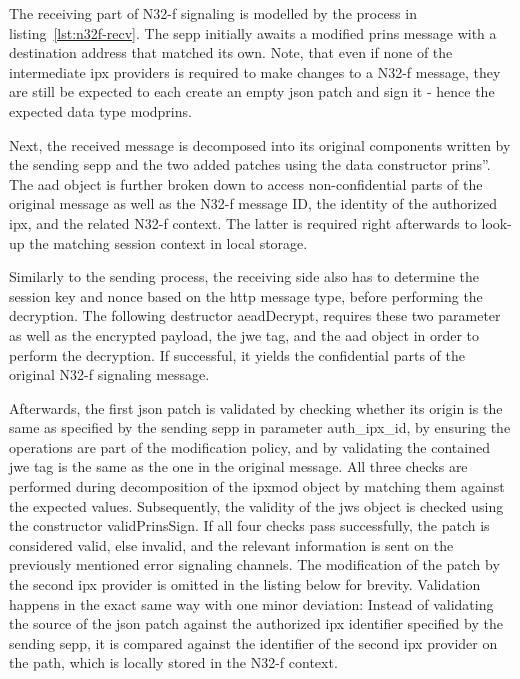 The receiving part of N32-f signaling is modelled by the process in listing~\ref{lst:n32f-recv}.
The \gls{sepp} initially awaits a modified \gls{prins} message with a destination address that matched its own.
Note, that even if none of the intermediate \gls{ipx} providers is required to make changes to a N32-f message, they are still be expected to each create an empty \gls{json} patch and sign it - hence the expected data type {\sffamily modprins}.

Next, the received message is decomposed into its original components written by the sending \gls{sepp} and the two added patches using the data constructor {\sffamily prins''}.
The \gls{aad} object is further broken down to access non-confidential parts of the original message as well as the N32-f message ID, the identity of the authorized \gls{ipx}, and the related N32-f context.
The latter is required right afterwards to look-up the matching session context in local storage.

Similarly to the sending process, the receiving side also has to determine the session key and nonce based on the \gls{http} message type, before performing the decryption.
The following destructor {\sffamily aeadDecrypt}, requires these two parameter as well as the encrypted payload, the \gls{jwe} tag, and the \gls{aad} object in order to perform the decryption.
If successful, it yields the confidential parts of the original N32-f signaling message.

Afterwards, the first \gls{json} patch is validated by checking whether its origin is the same as specified by the sending \gls{sepp} in parameter {\sffamily auth\_ipx\_id}, by ensuring the operations are part of the modification policy, and by validating the contained \gls{jwe} tag is the same as the one in the original message.
All three checks are performed during decomposition of the {\sffamily ipxmod} object by matching them against the expected values.
Subsequently, the validity of the \gls{jws} object is checked using the constructor {\sffamily validPrinsSign}.
If all four checks pass successfully, the patch is considered valid, else invalid, and the relevant information is sent on the previously mentioned error signaling channels.
The modification of the patch by the second \gls{ipx} provider is omitted in the listing below for brevity.
Validation happens in the exact same way with one minor deviation: Instead of validating the source of the \gls{json} patch against the authorized \gls{ipx} identifier specified by the sending \gls{sepp}, it is compared against the identifier of the second \gls{ipx} provider on the path, which is locally stored in the N32-f context.

